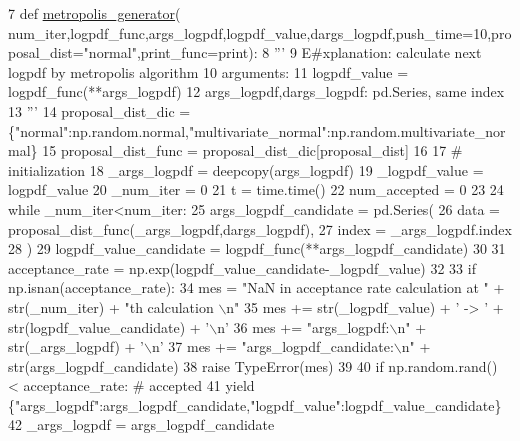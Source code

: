 \begin{DoxyCode}
7 \textcolor{keyword}{def }\hyperlink{namespacemcgenerator_a8f55af530516085f0a5169e130a9b35b}{metropolis\_generator}(
      num\_iter,logpdf\_func,args\_logpdf,logpdf\_value,dargs\_logpdf,push\_time=10,proposal\_dist="normal",print\_func=print):
8     \textcolor{stringliteral}{'''}
9 \textcolor{stringliteral}{    E#xplanation: calculate next logpdf by metropolis algorithm}
10 \textcolor{stringliteral}{    arguments:}
11 \textcolor{stringliteral}{        logpdf\_value = logpdf\_func(**args\_logpdf)}
12 \textcolor{stringliteral}{        args\_logpdf,dargs\_logpdf: pd.Series, same index}
13 \textcolor{stringliteral}{    '''}
14     proposal\_dist\_dic = \{\textcolor{stringliteral}{"normal"}:np.random.normal,\textcolor{stringliteral}{"multivariate\_normal"}:np.random.multivariate\_normal\}
15     proposal\_dist\_func = proposal\_dist\_dic[proposal\_dist]
16     
17     \textcolor{comment}{# initialization}
18     \_args\_logpdf = deepcopy(args\_logpdf)
19     \_logpdf\_value = logpdf\_value
20     \_num\_iter = 0
21     t = time.time()
22     num\_accepted = 0
23 
24     \textcolor{keywordflow}{while} \_num\_iter<num\_iter:
25         args\_logpdf\_candidate = pd.Series(
26             data = proposal\_dist\_func(\_args\_logpdf,dargs\_logpdf),
27             index = \_args\_logpdf.index
28             )
29         logpdf\_value\_candidate = logpdf\_func(**args\_logpdf\_candidate)
30         
31         acceptance\_rate = np.exp(logpdf\_value\_candidate-\_logpdf\_value)
32         
33         \textcolor{keywordflow}{if} np.isnan(acceptance\_rate):
34             mes = \textcolor{stringliteral}{"NaN in acceptance rate calculation at "} + str(\_num\_iter) + \textcolor{stringliteral}{"th calculation \(\backslash\)n"}
35             mes += str(\_logpdf\_value) + \textcolor{stringliteral}{' -> '} + str(logpdf\_value\_candidate) + \textcolor{stringliteral}{'\(\backslash\)n'}
36             mes += \textcolor{stringliteral}{"args\_logpdf:\(\backslash\)n"} + str(\_args\_logpdf) + \textcolor{stringliteral}{'\(\backslash\)n'}
37             mes += \textcolor{stringliteral}{"args\_logpdf\_candidate:\(\backslash\)n"} + str(args\_logpdf\_candidate)
38             \textcolor{keywordflow}{raise} TypeError(mes)
39         
40         \textcolor{keywordflow}{if} np.random.rand() < acceptance\_rate: \textcolor{comment}{# accepted}
41             \textcolor{keywordflow}{yield} \{\textcolor{stringliteral}{"args\_logpdf"}:args\_logpdf\_candidate,\textcolor{stringliteral}{"logpdf\_value"}:logpdf\_value\_candidate\}
42             \_args\_logpdf = args\_logpdf\_candidate

\end{DoxyCode}
